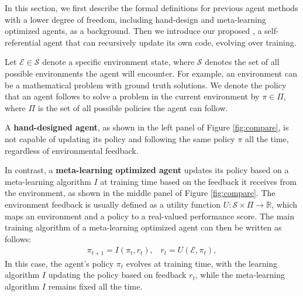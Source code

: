 In this section, we first describe the formal definitions for previous agent methods with a lower degree of freedom, including hand-design and meta-learning optimized agents, as a background. Then we introduce our proposed \framework, a self-referential agent that can recursively update its own code, evolving over training.



Let $\mathcal{E} \in \mathcal{S}$ denote a specific environment state, where $\mathcal{S}$ denotes the set of all possible environments the agent will encounter. For example, an environment can be a mathematical problem with ground truth solutions.
We denote the policy that an agent follows to solve a problem in the current environment by $\pi \in \Pi$, where $\Pi$ is the set of all possible policies the agent can follow. 

A \textbf{hand-designed agent}, as shown in the left panel of Figure \ref{fig:compare}, is not capable of updating its policy and following the same policy $\pi$ all the time, regardless of environmental feedback.

In contrast, a \textbf{meta-learning optimized agent} updates its policy based on a meta-learning algorithm $I$ at training time based on the feedback it receives from the environment, as shown in the middle panel of Figure \ref{fig:compare}. The environment feedback is usually defined as a utility function $U: \mathcal{S} \times \Pi \rightarrow \mathbb{R}$, which maps an environment and a policy to a real-valued performance score. The main training algorithm of a meta-learning optimized agent can then be written as follows:
\begin{align*}
    \pi_{t+1} = I(\pi_t, r_t),\;\;\; r_t = U(\mathcal{E}, \pi_t),
\end{align*}
In this case, the agent's policy $\pi_t$ evolves at training time, with the learning algorithm $I$ updating the policy based on feedback $r_t$, while the meta-learning algorithm $I$ remains fixed all the time.



